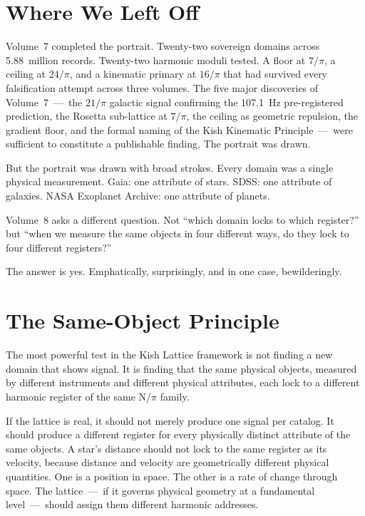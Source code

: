 \documentclass[11pt, letterpaper, openany]{book}
\begin{document}
\section*{Where We Left Off}

Volume~7 completed the portrait. Twenty-two sovereign domains across 5.88~million
records. Twenty-two harmonic moduli tested. A floor at $7/\pi$, a ceiling at
$24/\pi$, and a kinematic primary at $16/\pi$ that had survived every falsification
attempt across three volumes. The five major discoveries of Volume~7~---~the
$21/\pi$ galactic signal confirming the 107.1~Hz pre-registered prediction, the
Rosetta sub-lattice at $7/\pi$, the ceiling as geometric repulsion, the gradient
floor, and the formal naming of the Kish Kinematic Principle~---~were sufficient to
constitute a publishable finding. The portrait was drawn.

But the portrait was drawn with broad strokes. Every domain was a single physical
measurement. Gaia: one attribute of stars. SDSS: one attribute of galaxies. NASA
Exoplanet Archive: one attribute of planets.

Volume~8 asks a different question. Not ``which domain locks to which register?''
but ``when we measure the same objects in four different ways, do they lock to four
different registers?''

The answer is yes. Emphatically, surprisingly, and in one case, bewilderingly.

\section*{The Same-Object Principle}

The most powerful test in the Kish Lattice framework is not finding a new domain
that shows signal. It is finding that the same physical objects, measured by
different instruments and different physical attributes, each lock to a different
harmonic register of the same N/$\pi$ family.

If the lattice is real, it should not merely produce one signal per catalog. It
should produce a different register for every physically distinct attribute of the
same objects. A star's distance should not lock to the same register as its
velocity, because distance and velocity are geometrically different physical
quantities. One is a position in space. The other is a rate of change through
space. The lattice~---~if it governs physical geometry at a fundamental
level~---~should assign them different harmonic addresses.
\end{document}
